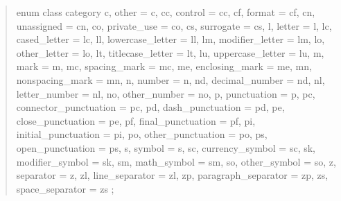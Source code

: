 \documentclass{wg21}
\begin{document}
\begin{quote}
\begin{itemdecl}
enum class category {
    c,
    other = c,
    cc,
    control = cc,
    cf,
    format = cf,
    cn,
    unassigned = cn,
    co,
    private_use = co,
    cs,
    surrogate = cs,
    l,
    letter = l,
    lc,
    cased_letter = lc,
    ll,
    lowercase_letter = ll,
    lm,
    modifier_letter = lm,
    lo,
    other_letter = lo,
    lt,
    titlecase_letter = lt,
    lu,
    uppercase_letter = lu,
    m,
    mark = m,
    mc,
    spacing_mark = mc,
    me,
    enclosing_mark = me,
    mn,
    nonspacing_mark = mn,
    n,
    number = n,
    nd,
    decimal_number = nd,
    nl,
    letter_number = nl,
    no,
    other_number = no,
    p,
    punctuation = p,
    pc,
    connector_punctuation = pc,
    pd,
    dash_punctuation = pd,
    pe,
    close_punctuation = pe,
    pf,
    final_punctuation = pf,
    pi,
    initial_punctuation = pi,
    po,
    other_punctuation = po,
    ps,
    open_punctuation = ps,
    s,
    symbol = s,
    sc,
    currency_symbol = sc,
    sk,
    modifier_symbol = sk,
    sm,
    math_symbol = sm,
    so,
    other_symbol = so,
    z,
    separator = z,
    zl,
    line_separator = zl,
    zp,
    paragraph_separator = zp,
    zs,
    space_separator = zs
};
\end{itemdecl}


\end{quote}
\end{document}
